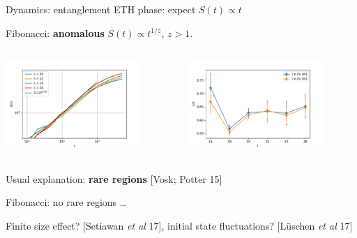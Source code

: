 \begin{frame}{Dynamics: entanglement}
\textcolor{comp}{ETH phase}: expect $S(t) \propto t$

Fibonacci: \textbf{anomalous} $S(t) \propto t^{1/z}$, $z > 1$.

\begin{columns}
\begin{column}{0.5\textwidth}
\centering
\includegraphics[width=0.8\textwidth]{img/3_Fibonacci/entanglement_scaling_h1_shift0}
\end{column}
\begin{column}{0.5\textwidth}
\centering
\includegraphics[width=0.8\textwidth]{img/3_Fibonacci/fits_entropy_h1_shift0}
\end{column}
\end{columns}
Usual explanation: \textbf{rare regions} {\footnotesize[Vosk; Potter 15]}

Fibonacci: no rare regions \dots 

Finite size effect? {\footnotesize[Setiawan \emph{et al} 17]}, initial state fluctuations? {\footnotesize[Lüschen \emph{et al} 17]}
\end{frame}